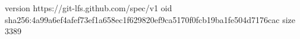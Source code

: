 version https://git-lfs.github.com/spec/v1
oid sha256:4a99a6ef4afef73ef1a658ec1f629820ef9ca5170f0fcb19ba1fe504d7176cac
size 3389
